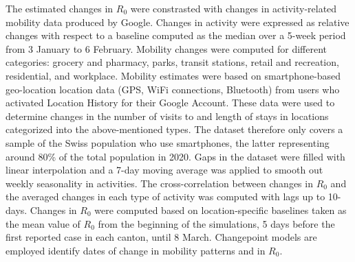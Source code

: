 The estimated changes in $R_0$  were constrasted with changes in activity-related mobility data produced by Google\cite{GoogleLLC:GoogleCOVID19Community:2020}. Changes in activity were expressed as relative changes with respect to a baseline computed as the median over a 5-week period from 3 January to 6 February. Mobility changes were computed for different categories: grocery and pharmacy, parks, transit stations, retail and recreation, residential, and workplace. Mobility estimates were based on smartphone-based geo-location location data (GPS, WiFi connections, Bluetooth) from users who activated Location History for their Google Account. These data were used to determine changes in the number of visits to and length of stays in locations categorized into the above-mentioned types. The dataset therefore only covers a sample of the Swiss population who use smartphones, the latter representing around 80\% of the total population in 2020\cite{ODea:SmartphoneUsersSwitzerland:2020}. Gaps in the dataset were filled with linear interpolation and a 7-day moving average was applied to smooth out weekly seasonality in activities. The cross-correlation between changes in $R_0$ and the averaged changes in each type of activity was computed with lags up to 10-days. Changes in $R_0$ were computed based on location-specific baselines taken as the mean value of $R_0$ from the beginning of the simulations, 5 days before the first reported case in each canton, until 8 March. Changepoint models are employed identify dates of change in mobility patterns and in $R_0$. 


